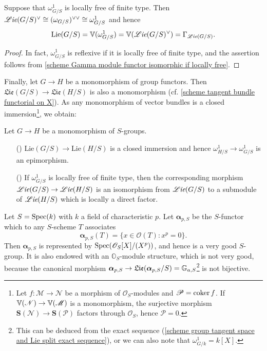 \begin{proposition}\label{scheme group omega_G/S locally free construct Lie}
Suppose that $\omega_{G/S}^1$ is locally free of finite type. Then $\operatorname{\mathscr{L}\hspace*{-0.5pt}\textit{ie}}(G/S)^{\vee}\cong(\omega_{G/S})^{\vee\vee}\cong\omega_{G/S}^1$ and hence
\[\mathrm{Lie}(G/S)=\mathbb{V}(\omega_{G/S}^1)=\mathbb{V}(\operatorname{\mathscr{L}\hspace*{-0.5pt}\textit{ie}}(G/S)^{\vee})=\Gamma_{\operatorname{\mathscr{L}\hspace*{-0.5pt}\textit{ie}}(G/S)}.\]
\end{proposition}
\begin{proof}
In fact, $\omega_{G/S}^1$ is reflexive if it is locally free of finite type, and the assertion follows from \cref{scheme Gamma module functor isomorphic if locally free}.
\end{proof}

Finally, let $G\to H$ be a monomorphism of group functors. Then $\mathfrak{Lie}(G/S)\to\mathfrak{Lie}(H/S)$ is also a monomorphism (cf. \cref{scheme tangent bundle functorial on X}). As any monomorphism of vector bundles is a closed immersion\footnote{Let $f:\mathscr{M}\to\mathscr{N}$ be a morphism of $\mathscr{O}_S$-modules and $\mathscr{P}=\operatorname{coker} f$. If $\mathbb{V}(\mathscr{N})\to\mathbb{V}(\mathscr{M})$ is a monomorphism, the surjective morphism $\bm{S}(\mathscr{N})\to\bm{S}(\mathscr{P})$ factors through $\mathscr{O}_S$, hence $\mathscr{P}=0$.}, we obtain:

\begin{corollary}
Let $G\to H$ be a monomorphism of $S$-groups.
\begin{enumerate}
    \item[(\rmnum{1})] $\mathrm{Lie}(G/S)\to\mathrm{Lie}(H/S)$ is a closed immersion and hence $\omega_{H/S}^1\to\omega_{G/S}^1$ is an epimorphism.
    \item[(\rmnum{2})] If $\omega_{G/S}^1$ is locally free of finite type, then the corresponding morphism $\operatorname{\mathscr{L}\hspace*{-0.5pt}\textit{ie}}(G/S)\to\operatorname{\mathscr{L}\hspace*{-0.5pt}\textit{ie}}(H/S)$ is an isomorphism from $\operatorname{\mathscr{L}\hspace*{-0.5pt}\textit{ie}}(G/S)$ to a submodule of $\operatorname{\mathscr{L}\hspace*{-0.5pt}\textit{ie}}(H/S)$ which is locally a direct factor. 
\end{enumerate}
\end{corollary}

\begin{example}\label{scheme O_S-module alpha_p not good}
Let $S=\mathrm{Spec}(k)$ with $k$ a field of characteristic $p$. Let $\bm{\alpha}_{p,S}$ be the $S$-functor which to any $S$-scheme $T$ associates
\[\bm{\alpha}_{p,S}(T)=\{x\in\mathscr{O}(T):x^p=0\}.\]
Then $\bm{\alpha}_{p,S}$ is represented by $\mathrm{Spec}(\mathscr{O}_S[X]/(X^p))$, and hence is a very good $S$-group. It is also endowed with an $\mathbb{O}_S$-module structure, which is not very good, because the canonical morphism $\bm{\alpha}_{p,S}\to\mathfrak{Lie}(\bm{\alpha}_{p,S}/S)=\mathbb{G}_{a,S}$\footnote{This can be deduced from the exact sequence (\ref{scheme group tangent space and Lie split exact sequence}), or we can also note that $\omega_{G/k}^1=k[X]$.} is not bijective.
\end{example}

